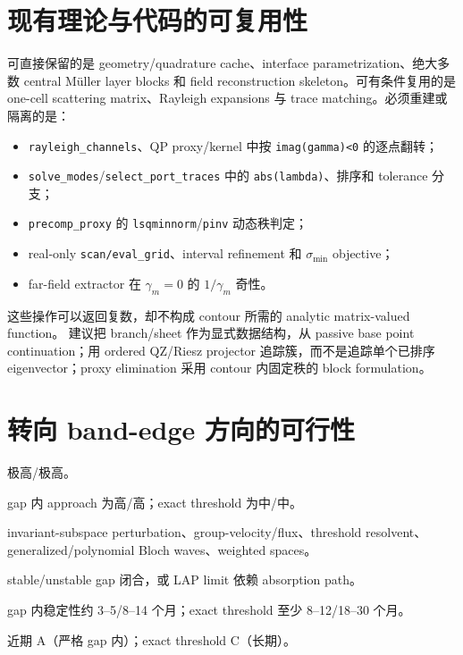 \documentclass[UTF8,11pt,fontset=none]{ctexart}
\begin{document}
\section{现有理论与代码的可复用性}

可直接保留的是 geometry/quadrature cache、interface parametrization、绝大多数 central
Müller layer blocks 和 field reconstruction skeleton。可有条件复用的是 one-cell
scattering matrix、Rayleigh expansions 与 trace matching。必须重建或隔离的是：

\begin{itemize}
  \item \texttt{rayleigh\_channels}、QP proxy/kernel 中按
    \texttt{imag(gamma)<0} 的逐点翻转；
  \item \texttt{solve\_modes}/\texttt{select\_port\_traces} 中的
    \texttt{abs(lambda)}、排序和 tolerance 分支；
  \item \texttt{precomp\_proxy} 的 \texttt{lsqminnorm}/\texttt{pinv} 动态秩判定；
  \item real-only \texttt{scan/eval\_grid}、interval refinement 和
    \(\sigma_{\min}\) objective；
  \item far-field extractor 在 \(\gamma_m=0\) 的 \(1/\gamma_m\) 奇性。
\end{itemize}

这些操作可以返回复数，却不构成 contour 所需的 analytic matrix-valued function。
建议把 branch/sheet 作为显式数据结构，从 passive base point continuation；用 ordered
QZ/Riesz projector 追踪簇，而不是追踪单个已排序 eigenvector；proxy elimination 采用
contour 内固定秩的 block formulation。

\section{转向 band-edge 方向的可行性}

\begin{description}[style=multiline,leftmargin=4.3cm,labelwidth=4.0cm]
  \item[几何/PDE 相似性：] 极高/极高。
  \item[理论/代码复用：] gap 内 approach 为高/高；exact threshold 为中/中。
  \item[新增数学：] invariant-subspace perturbation、group-velocity/flux、threshold
    resolvent、generalized/polynomial Bloch waves、weighted spaces。
  \item[关键失败点：] stable/unstable gap 闭合，或 LAP limit 依赖 absorption path。
  \item[最小/完整时间：] gap 内稳定性约 3--5/8--14 个月；exact threshold 至少
    8--12/18--30 个月。
  \item[推荐：] 近期 A（严格 gap 内）；exact threshold C（长期）。
\end{description}
\end{document}
